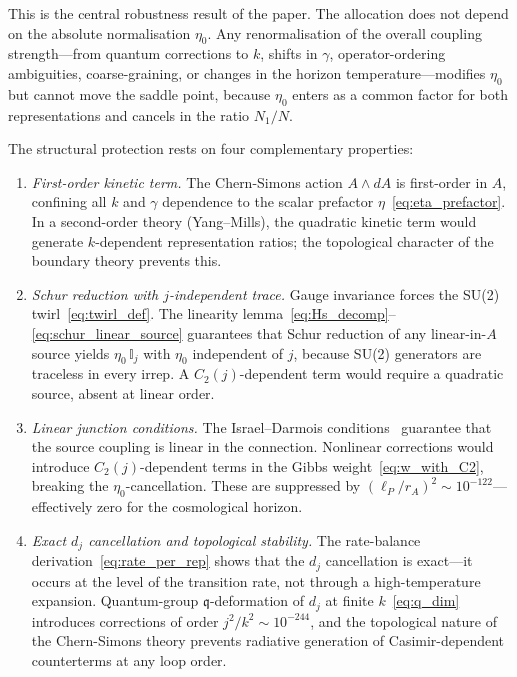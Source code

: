 \documentclass[aps,prd,twocolumn,10pt,superscriptaddress,nofootinbib]{revtex4-2}
\begin{document}
This is the central robustness result of the paper.  The
allocation does not depend on the absolute normalisation $\eta_0$.
Any renormalisation of the overall coupling strength---from quantum
corrections to $k$, shifts in $\gamma$, operator-ordering
ambiguities, coarse-graining, or changes in the horizon
temperature---modifies $\eta_0$ but cannot move the saddle point,
because $\eta_0$ enters as a common factor for both representations
and cancels in the ratio $N_1/N$.

The structural protection rests on four complementary properties:
\begin{enumerate}
\item \emph{First-order kinetic term.}  The Chern-Simons action
  $A \wedge dA$ is first-order in $A$, confining all $k$ and
  $\gamma$ dependence to the scalar prefactor
  $\eta$~\eqref{eq:eta_prefactor}.  In a second-order theory
  (Yang--Mills), the quadratic kinetic term would generate
  $k$-dependent representation ratios; the topological character
  of the boundary theory prevents this.

\item \emph{Schur reduction with $j$-independent trace.}
  Gauge invariance forces the SU(2)
  twirl~\eqref{eq:twirl_def}.  The linearity
  lemma~\eqref{eq:Hs_decomp}--\eqref{eq:schur_linear_source}
  guarantees that Schur reduction of any linear-in-$A$ source
  yields $\eta_0\,\mathbb{I}_j$ with $\eta_0$ independent of $j$,
  because SU(2) generators are traceless in every irrep.  A
  $C_2(j)$-dependent term would require a quadratic source,
  absent at linear order.

\item \emph{Linear junction conditions.}  The Israel--Darmois
  conditions~\cite{Israel1966} guarantee that the source coupling
  is linear in the connection.  Nonlinear corrections would
  introduce $C_2(j)$-dependent terms in the
  Gibbs weight~\eqref{eq:w_with_C2}, breaking the
  $\eta_0$-cancellation.  These are suppressed by
  $(\ell_P/r_A)^2 \sim 10^{-122}$---effectively zero for the
  cosmological horizon.

\item \emph{Exact $d_j$ cancellation and topological stability.}
  The rate-balance derivation~\eqref{eq:rate_per_rep} shows that
  the $d_j$ cancellation is exact---it occurs at the level of
  the transition rate, not through a high-temperature expansion.
  Quantum-group $\mathfrak{q}$-deformation of $d_j$ at finite
  $k$~\eqref{eq:q_dim} introduces corrections of order
  $j^2/k^2 \sim 10^{-244}$, and the topological nature of the
  Chern-Simons theory prevents radiative generation of
  Casimir-dependent counterterms at any loop order.
\end{enumerate}
\end{document}
